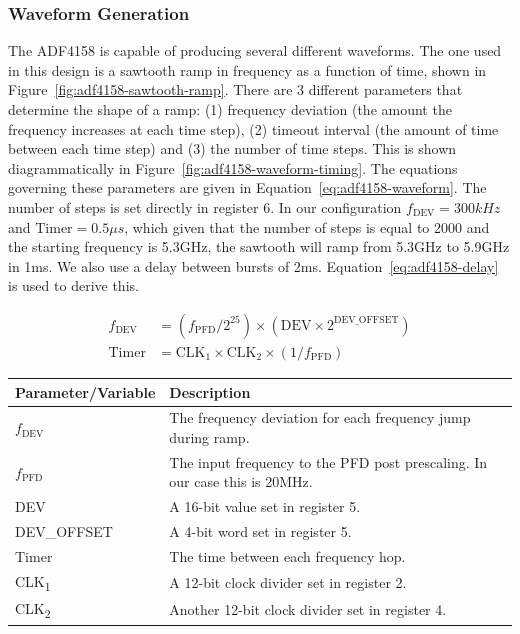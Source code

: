 \subsubsection{Waveform Generation}
\label{sec:adf4158-waveform-generation}

The ADF4158 is capable of producing several different waveforms. The one used in this design is a
sawtooth ramp in frequency as a function of time, shown in
Figure~\ref{fig:adf4158-sawtooth-ramp}. There are 3 different parameters that determine the shape of
a ramp: (1) frequency deviation (the amount the frequency increases at each time step), (2) timeout
interval (the amount of time between each time step) and (3) the number of time steps. This is shown
diagrammatically in Figure~\ref{fig:adf4158-waveform-timing}. The equations governing these
parameters are given in Equation~\ref{eq:adf4158-waveform}. The number of steps is set directly in
register 6. In our configuration $f_{\text{DEV}} = 300\si{kHz}$ and $\text{Timer} = 0.5\si{\mu s}$,
which given that the number of steps is equal to 2000 and the starting frequency is 5.3GHz, the
sawtooth will ramp from 5.3GHz to 5.9GHz in 1ms. We also use a delay between bursts of
2ms. Equation~\ref{eq:adf4158-delay} is used to derive this.

\begin{align}
  f_{\text{DEV}} &= \left(f_{\text{PFD}}/2^{25}\right) \times \left(\text{DEV}\times
                   2^{\text{DEV\_OFFSET}}\right) \label{eq:adf4158-waveform} \\
  \text{Timer} &= \text{CLK}_1 \times \text{CLK}_2 \times \left(1/f_{\text{PFD}}\right) \nonumber
\end{align}

\label{tab:adf4158-waveform-equation-vars}
\begin{tabularx}{\textwidth}{l X>{\raggedright\arraybackslash}X}
        \toprule
        \textbf{Parameter/Variable} & \textbf{Description} \\
        \midrule

        \endhead

        $f_{\text{DEV}}$ & The frequency deviation for each frequency jump during ramp. \\
        $f_{\text{PFD}}$ & The input frequency to the PFD post prescaling. In our case this is 20MHz. \\
        DEV & A 16-bit value set in register 5. \\
        DEV\_OFFSET & A 4-bit word set in register 5. \\
        Timer & The time between each frequency hop. \\
        CLK\textsubscript{1} & A 12-bit clock divider set in register 2. \\
        CLK\textsubscript{2} & Another 12-bit clock divider set in register 4. \\

        \bottomrule
\end{tabularx}

